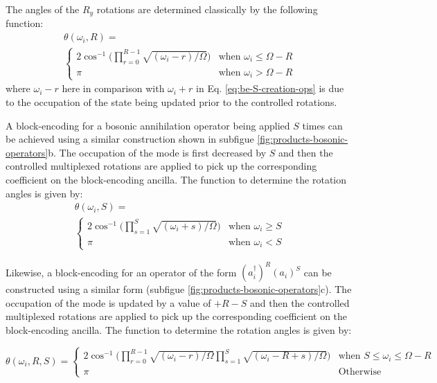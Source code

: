 The angles of the $R_y$ rotations are determined classically by the following function:
\begin{equation}
    \begin{split}
        \theta(\omega_i, R) = \\
        \begin{cases} 
            2\cos^{-1}\Big(\prod_{r=0}^{R-1}\sqrt{(\omega_i - r) / \Omega}\Big) & \text{when } \omega_i \leq \Omega - R \\
            \pi & \text{when } \omega_i > \Omega - R
        \end{cases}
    \end{split}
\end{equation}
where $\omega_i - r$ here in comparison with $\omega_i + r$ in Eq. \ref{eq:be-S-creation-ops} is due to the occupation of the state being updated prior to the controlled rotations.

A block-encoding for a bosonic annihilation operator being applied $S$ times can be achieved using a similar construction shown in subfigue \ref{fig:products-bosonic-operators}b.
The occupation of the mode is first decreased by $S$ and then the controlled multiplexed rotations are applied to pick up the corresponding coefficient on the block-encoding ancilla.
The function to determine the rotation angles is given by:
\begin{equation}
    \begin{split}
        \theta(\omega_i, S) = \\
        \begin{cases} 
            2\cos^{-1}\Big(\prod_{s=1}^{S}\sqrt{(\omega_i + s) / \Omega}\Big) & \text{when } \omega_i \geq S \\
            \pi & \text{when } \omega_i < S
        \end{cases}
    \end{split}
\end{equation}

Likewise, a block-encoding for an operator of the form $(a_i^\dagger)^R (a_i)^S$ can be constructed using a similar form (subfigue \ref{fig:products-bosonic-operators}c).
The occupation of the mode is updated by a value of $+ R - S$ and then the controlled multiplexed rotations are applied to pick up the corresponding coefficient on the block-encoding ancilla.
The function to determine the rotation angles is given by:
\begin{widetext}
\begin{equation}
    \theta(\omega_i, R, S) = 
    \begin{cases} 
        2\cos^{-1}\Big(\prod_{r=0}^{R-1}\sqrt{(\omega_i - r) / \Omega} \prod_{s=1}^{S}\sqrt{(\omega_i - R + s) / \Omega}\Big) & \text{when } S \leq \omega_i \leq \Omega - R \\
        \pi & \text{Otherwise} 
    \end{cases}
\end{equation}
\end{widetext}

